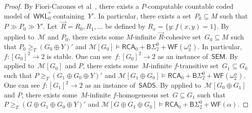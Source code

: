 \documentclass{article}
\numberwithin{theorem}{section}
\newcommand{\RCA}{\mathsf{RCA}}
\newcommand{\WKL}{\mathsf{WKL}}
\newcommand{\SEM}{\mathsf{SEM}}
\newcommand{\SADS}{\mathsf{SADS}}
\newcommand{\BSig}{\mathsf{B}\Sigma^0}
\newcommand{\WF}{\mathsf{WF}}
\newcommand{\M}{\mathcal{M}}
\begin{document}
\begin{proof}
By Fiori-Carones et al~\cite[Lemma 3.2]{fiori2021isomorphism}, there exists a $P$-computable countable coded model of~$\WKL_0^*$ containing~$Y'$. In particular, there exists a set~$P_0 \subseteq M$ such that $P \gg P_0 \gg Y'$.
Let~$\vec{R} = R_0, R_1, \dots$ be defined by $R_x = \{ y : f(x, y) = 1 \}$.
By  applied to~$\M$ and $P_0$, there exists some $M$-infinite $\vec{R}$-cohesive set~$G_0 \subseteq M$ such that $P_0 \geq_T (G_0 \oplus Y)'$ and $\M[G_0] \models \RCA_0 + \BSig_2 + \WF(\omega_3^{\alpha})$. In particular, $f : [G_0]^2 \to 2$ is stable. One can see~$f : [G_0]^2 \to 2$ as an instance of~$\SEM$.
By  applied to~$\M[G_0]$ and $P$, there exists some~$M$-infinite $f$-transitive set~$G_1 \subseteq G_0$ such that $P \geq_T (G_1 \oplus G_0 \oplus Y)'$ and $\M[G_1 \oplus G_0] \models \RCA_0 + \BSig_2 + \WF(\omega_2^\alpha)$. One can see $f : [G_1]^2 \to 2$ as an instance of~$\SADS$.
By  applied to~$\M[G_0 \oplus G_1]$ and $P$, there exists some~$M$-infinite $f$-homogeneous set~$G \subseteq G_1$ such that $P \geq_T (G \oplus G_1 \oplus G_0 \oplus Y)'$ and $\M[G \oplus G_1 \oplus G_0] \models \RCA_0 + \BSig_2 + \WF(\alpha)$.
\end{proof}



\end{document}
